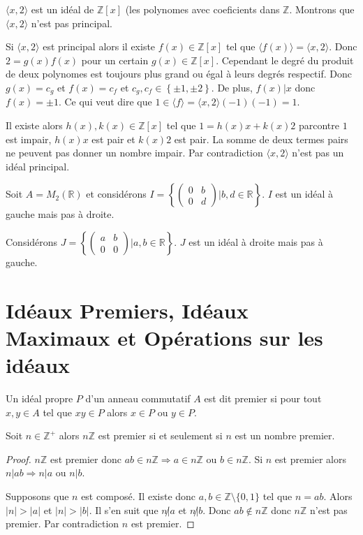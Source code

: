 \begin{ex}
$\langle x,2\rangle$ est un idéal de $\mathbb{Z}[x]$ (les polynomes avec coeficients dans $\mathbb{Z}$. Montrons que $\langle x,2\rangle$ n'est pas principal.

Si $\langle x,2\rangle$ est principal alors il existe $f(x)\in\mathbb{Z}[x]$ tel que $\langle f(x)\rangle=\langle x,2\rangle$. Donc $2=g(x)f(x)$ pour un certain $g(x)\in\mathbb{Z}[x]$. Cependant le degré du produit de deux polynomes  est toujours plus grand ou égal à leurs degrés respectif. Donc $g(x)=c_g$ et $f(x)=c_f$ et $c_g,c_f\in\left\{\pm1,\pm2\right\}$. De plus, $f(x)|x$ donc $f(x)=\pm1$. Ce qui veut dire que $1\in\langle f \rangle=\langle x,2\rangle(-1)(-1)=1$. 

Il existe alors $h(x),k(x)\in\mathbb{Z}[x]$ tel que $1=h(x)x+k(x)2$ parcontre $1$ est impair, $h(x)x$ est pair et $k(x)2$ est pair. La somme de deux termes pairs ne peuvent pas donner un nombre impair. Par contradiction $\langle x,2\rangle$ n'est pas un idéal principal.
\end{ex}

\begin{ex}
Soit $A=M_2\left(\mathbb{R}\right)$ et considérons $I=\left\{ \left( 
\begin{array}{cc}
0&b\\
0&d
\end{array}
\right) | b,d\in\mathbb{R}\right\}$. $I$ est un idéal à gauche mais pas à droite.

Considérons $J=\left\{ \left( 
\begin{array}{cc}
a&b\\
0&0
\end{array}
\right) | a,b\in\mathbb{R}\right\}$. $J$ est un idéal à droite mais pas à gauche.
\end{ex}

\section{Idéaux Premiers, Idéaux Maximaux et Opérations sur les idéaux}
\begin{defn}
Un idéal propre $P$ d'un anneau commutatif $A$ est dit premier si pour tout $x,y\in A$ tel que $xy\in P$ alors $x\in P$ ou $y\in P$.
\end{defn}

\begin{ex}
Soit $n\in\mathbb{Z}^+$ alors $n\mathbb{Z}$ est premier si et seulement si $n$ est un nombre premier.
\end{ex}
\begin{proof}
$n\mathbb{Z}$ est premier donc $ab\in n\mathbb{Z}\Longrightarrow a\in n\mathbb{Z}$ ou $b\in n\mathbb{Z}$. Si $n$ est premier alors $n|ab\Longrightarrow n|a$ ou $n|b$.

Supposons que $n$ est composé. Il existe donc $a,b\in\mathbb{Z}\setminus\{0,1\}$ tel que $n=ab$. Alors $|n|>|a|$ et $|n|>|b|$. Il s'en suit que $n\not|a$ et $n\not|b$. Donc $ab\not\in n\mathbb{Z}$ donc $n\mathbb{Z}$ n'est pas premier. Par contradiction $n$ est premier.
\end{proof}

